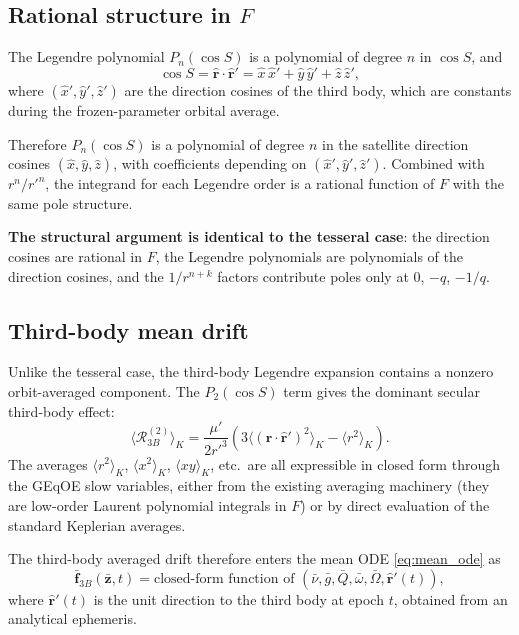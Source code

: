\documentclass[11pt]{article}
\newcommand{\mean}[1]{\langle #1 \rangle}
\begin{document}
\subsection{Rational structure in \texorpdfstring{$F$}{F}}

The Legendre polynomial $P_n(\cos S)$ is a polynomial of degree $n$ in
$\cos S$, and
\begin{equation}
\cos S
= \hat{\bm r} \cdot \hat{\bm r}'
= \hat x\, \hat x' + \hat y\, \hat y' + \hat z\, \hat z',
\end{equation}
where $(\hat x', \hat y', \hat z')$ are the direction cosines of the
third body, which are constants during the frozen-parameter orbital
average.

Therefore $P_n(\cos S)$ is a polynomial of degree $n$ in the satellite
direction cosines $(\hat x, \hat y, \hat z)$, with coefficients depending
on $(\hat x', \hat y', \hat z')$. Combined with $r^n / r'^n$, the
integrand for each Legendre order is a rational function of $F$ with the
same pole structure.

\textbf{The structural argument is identical to the tesseral case}:
the direction cosines are rational in $F$, the Legendre polynomials are
polynomials of the direction cosines, and the $1/r^{n+k}$ factors
contribute poles only at $0$, $-q$, $-1/q$.

\subsection{Third-body mean drift}

Unlike the tesseral case, the third-body Legendre expansion contains a
nonzero orbit-averaged component. The $P_2(\cos S)$ term gives the
dominant secular third-body effect:
\begin{equation}
\mean{\mathcal R_{3B}^{(2)}}_K
= \frac{\mu'}{2r'^3}\left(
3\mean{(\bm r \cdot \hat{\bm r}')^2}_K - \mean{r^2}_K
\right).
\end{equation}
The averages $\mean{r^2}_K$, $\mean{x^2}_K$, $\mean{xy}_K$, etc.\ are
all expressible in closed form through the GEqOE slow variables, either
from the existing averaging machinery (they are low-order Laurent
polynomial integrals in $F$) or by direct evaluation of the standard
Keplerian averages.

The third-body averaged drift therefore enters the mean ODE
\eqref{eq:mean_ode} as
\begin{equation}
\bar{\bm f}_{3B}(\bar{\bm z}, t)
= \text{closed-form function of }
(\bar\nu, \bar g, \bar Q, \bar\omega, \bar\Omega,
\hat{\bm r}'(t)),
\end{equation}
where $\hat{\bm r}'(t)$ is the unit direction to the third body at
epoch $t$, obtained from an analytical ephemeris.
\end{document}
